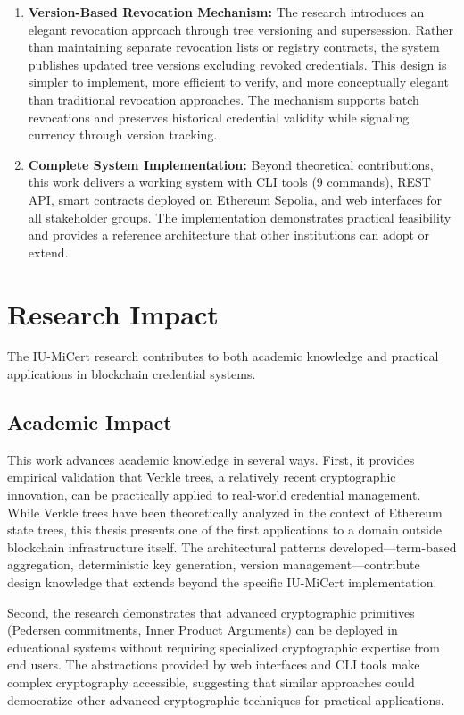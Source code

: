 \begin{enumerate}
    \item \textbf{Version-Based Revocation Mechanism:} The research introduces an elegant revocation approach through tree versioning and supersession. Rather than maintaining separate revocation lists or registry contracts, the system publishes updated tree versions excluding revoked credentials. This design is simpler to implement, more efficient to verify, and more conceptually elegant than traditional revocation approaches. The mechanism supports batch revocations and preserves historical credential validity while signaling currency through version tracking.

    \item \textbf{Complete System Implementation:} Beyond theoretical contributions, this work delivers a working system with CLI tools (9 commands), REST API, smart contracts deployed on Ethereum Sepolia, and web interfaces for all stakeholder groups. The implementation demonstrates practical feasibility and provides a reference architecture that other institutions can adopt or extend.
\end{enumerate}

\section{Research Impact}
\label{sec:research-impact}

The IU-MiCert research contributes to both academic knowledge and practical applications in blockchain credential systems.

\subsection{Academic Impact}
\label{subsec:academic-impact}

This work advances academic knowledge in several ways. First, it provides empirical validation that Verkle trees, a relatively recent cryptographic innovation, can be practically applied to real-world credential management. While Verkle trees have been theoretically analyzed in the context of Ethereum state trees, this thesis presents one of the first applications to a domain outside blockchain infrastructure itself. The architectural patterns developed—term-based aggregation, deterministic key generation, version management—contribute design knowledge that extends beyond the specific IU-MiCert implementation.

Second, the research demonstrates that advanced cryptographic primitives (Pedersen commitments, Inner Product Arguments) can be deployed in educational systems without requiring specialized cryptographic expertise from end users. The abstractions provided by web interfaces and CLI tools make complex cryptography accessible, suggesting that similar approaches could democratize other advanced cryptographic techniques for practical applications.

